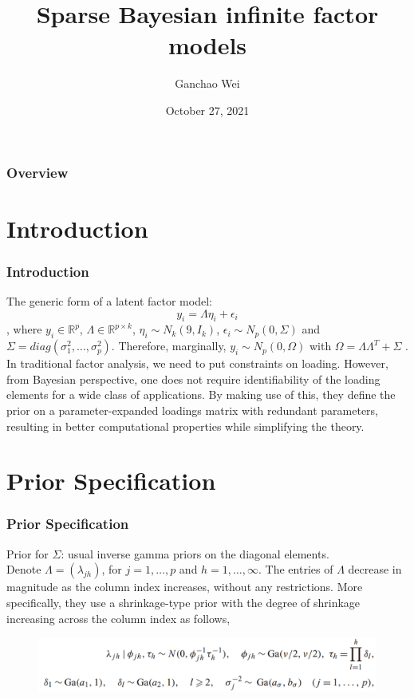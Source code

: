 \documentclass{beamer}
\title[BFA]{Sparse Bayesian infinite factor models}
\author{Ganchao Wei}
\date{October 27, 2021}
\begin{document}
	
	\begin{frame}
		\titlepage %
	\end{frame}
	
	\begin{frame}
		\frametitle{Overview} %
		\tableofcontents
	\end{frame}
	
	
	\section{Introduction}
	
	\begin{frame}
		\frametitle{Introduction}
		The generic form of a latent factor model:
		$$y_i = \Lambda \eta_i + \epsilon_i$$
		, where $y_i \in \mathbb{R}^p$, $\Lambda \in \mathbb{R}^{p \times k}$, $\eta_i \sim N_k(9, I_k)$, $\epsilon_i \sim N_p(0, \Sigma)$ and $\Sigma = diag(\sigma_1^2,\ldots, \sigma_p^2)$. Therefore, marginally, $y_i \sim N_p(0, \Omega)$ with $\Omega = \Lambda \Lambda^{T} + \Sigma$	.\\
		\vspace{\baselineskip}
		In traditional factor analysis, we need to put constraints on loading. However, from Bayesian perspective, one does not require identifiability of the loading elements for a wide class of applications.  By making use of this, they define the prior on a parameter-expanded loadings matrix with redundant parameters, resulting in better computational properties while simplifying the theory.
	\end{frame}
	
	\section{Prior Specification}
	\begin{frame}
		\frametitle{Prior Specification}
		Prior for $\Sigma$: usual inverse gamma priors on the diagonal elements.\\
		\vspace{\baselineskip}
		Denote $\Lambda = (\lambda_{jh})$, for $j=1,\ldots,p$ and $h=1,\ldots,\infty$. The entries of $\Lambda$ decrease in magnitude as the column index increases, without any restrictions. More specifically, they use a shrinkage-type prior with the degree of shrinkage increasing across the column index as follows,
		\begin{figure}
			\includegraphics[width=0.9\linewidth]{image001.png}
		\end{figure}
		
	\end{frame}
	
\end{document}
